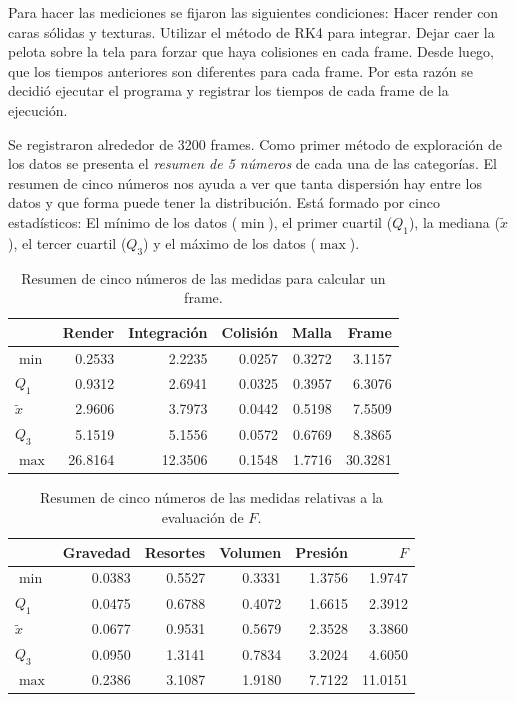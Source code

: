 Para hacer las mediciones se fijaron las siguientes condiciones:
Hacer render con caras sólidas y texturas.
Utilizar el método de RK4 para integrar.
Dejar caer la pelota sobre la tela para forzar que haya colisiones en cada frame.
Desde luego, que los tiempos anteriores son diferentes para cada frame.
Por esta razón se decidió ejecutar el programa y registrar los tiempos de cada frame de la ejecución.

Se registraron alrededor de 3200 frames.
Como primer método de exploración de los datos se presenta el \emph{resumen de 5 números} de cada una de las categorías.
El resumen de cinco números nos ayuda a ver que tanta dispersión hay entre los datos y que forma puede tener la distribución.
Está formado por cinco estadísticos: El mínimo de los datos ($\min$), el primer cuartil ($Q_1$), la mediana ($\tilde{x}$), el tercer cuartil ($Q_3$) y el máximo de los datos ($\max$).

\begin{table}
\begin{center}
\begin{tabular} {@{}lrrrrr@{}}
\toprule
 & Render & Integración & Colisión & Malla & Frame \\
\midrule 
 $\min$      &  0.2533 &  2.2235 & 0.0257 & 0.3272 &  3.1157 \\
 $Q_1$       &  0.9312 &  2.6941 & 0.0325 & 0.3957 &  6.3076 \\
 $\tilde{x}$ &  2.9606 &  3.7973 & 0.0442 & 0.5198 &  7.5509 \\
 $Q_3$       &  5.1519 &  5.1556 & 0.0572 & 0.6769 &  8.3865 \\
 $\max$      & 26.8164 & 12.3506 & 0.1548 & 1.7716 & 30.3281 \\
\bottomrule
\end{tabular}
\end{center}
\caption[Resumen de medidas por frame]{Resumen de cinco números de las medidas para calcular un frame.}
\label{resumenFrame:tabla}
\end{table}

\begin{table}
\begin{center}
\begin{tabular} {@{}lrrrrr@{}}
\toprule
 & Gravedad & Resortes & Volumen & Presión & $F$ \\
\midrule 
 $\min$      & 0.0383 & 0.5527 & 0.3331 & 1.3756 &  1.9747 \\
 $Q_1$       & 0.0475 & 0.6788 & 0.4072 & 1.6615 &  2.3912 \\
 $\tilde{x}$ & 0.0677 & 0.9531 & 0.5679 & 2.3528 &  3.3860 \\
 $Q_3$       & 0.0950 & 1.3141 & 0.7834 & 3.2024 &  4.6050 \\
 $\max$      & 0.2386 & 3.1087 & 1.9180 & 7.7122 & 11.0151 \\
\bottomrule
\end{tabular}
\end{center}
\caption[Resumen de medidas de evaluación de $F$]{Resumen de cinco números de las medidas relativas a la evaluación de $F$.}
\label{resumenFuerza:tabla}
\end{table}

